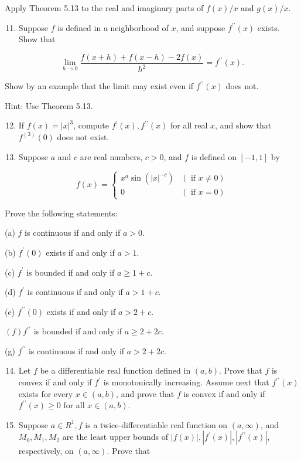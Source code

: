 \documentclass[10pt]{article}
\begin{document}
Apply Theorem 5.13 to the real and imaginary parts of $f(x) / x$ and $g(x) / x$.

\begin{enumerate}
  \setcounter{enumi}{10}
  \item Suppose $f$ is defined in a neighborhood of $x$, and suppose $f^{\prime \prime}(x)$ exists. Show that
\end{enumerate}

$$
\lim _{h \rightarrow 0} \frac{f(x+h)+f(x-h)-2 f(x)}{h^{2}}=f^{\prime \prime}(x) .
$$

Show by an example that the limit may exist even if $f^{\prime \prime}(x)$ does not.

Hint: Use Theorem 5.13.

\begin{enumerate}
  \setcounter{enumi}{11}
  \item If $f(x)=|x|^{3}$, compute $f^{\prime}(x), f^{\prime \prime}(x)$ for all real $x$, and show that $f^{(3)}(0)$ does not exist.

  \item Suppose $a$ and $c$ are real numbers, $c>0$, and $f$ is defined on $[-1,1]$ by

\end{enumerate}

$$
f(x)= \begin{cases}x^{a} \sin \left(|x|^{-c}\right) & (\text { if } x \neq 0) \\ 0 & (\text { if } x=0)\end{cases}
$$

Prove the following statements:

(a) $f$ is continuous if and only if $a>0$.

(b) $f^{\prime}(0)$ exists if and only if $a>1$.

(c) $f^{\prime}$ is bounded if and only if $a \geq 1+c$.

(d) $f^{\prime}$ is continuous if and only if $a>1+c$.

(e) $f^{\prime \prime}(0)$ exists if and only if $a>2+c$.

$(f) f^{\prime \prime}$ is bounded if and only if $a \geq 2+2 c$.

(g) $f^{\prime \prime}$ is continuous if and only if $a>2+2 c$.

\begin{enumerate}
  \setcounter{enumi}{13}
  \item Let $f$ be a differentiable real function defined in $(a, b)$. Prove that $f$ is convex if and only if $f^{\prime}$ is monotonically increasing. Assume next that $f^{\prime \prime}(x)$ exists for every $x \in(a, b)$, and prove that $f$ is convex if and only if $f^{\prime \prime}(x) \geq 0$ for all $x \in(a, b)$.

  \item Suppose $a \in R^{1}, f$ is a twice-differentiable real function on $(a, \infty)$, and $M_{0}, M_{1}, M_{2}$ are the least upper bounds of $|f(x)|,\left|f^{\prime}(x)\right|,\left|f^{\prime \prime}(x)\right|$, respectively, on $(a, \infty)$. Prove that

\end{enumerate}
\end{document}

